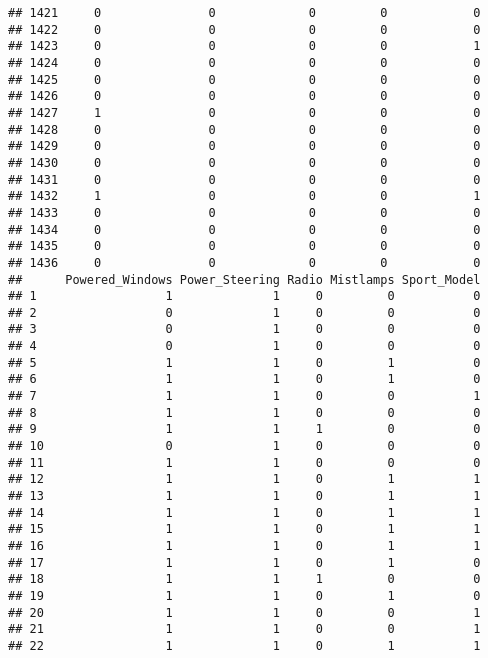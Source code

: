 \documentclass[]{article}
\begin{document}
\begin{verbatim}
## 1421     0               0             0         0            0
## 1422     0               0             0         0            0
## 1423     0               0             0         0            1
## 1424     0               0             0         0            0
## 1425     0               0             0         0            0
## 1426     0               0             0         0            0
## 1427     1               0             0         0            0
## 1428     0               0             0         0            0
## 1429     0               0             0         0            0
## 1430     0               0             0         0            0
## 1431     0               0             0         0            0
## 1432     1               0             0         0            1
## 1433     0               0             0         0            0
## 1434     0               0             0         0            0
## 1435     0               0             0         0            0
## 1436     0               0             0         0            0
##      Powered_Windows Power_Steering Radio Mistlamps Sport_Model
## 1                  1              1     0         0           0
## 2                  0              1     0         0           0
## 3                  0              1     0         0           0
## 4                  0              1     0         0           0
## 5                  1              1     0         1           0
## 6                  1              1     0         1           0
## 7                  1              1     0         0           1
## 8                  1              1     0         0           0
## 9                  1              1     1         0           0
## 10                 0              1     0         0           0
## 11                 1              1     0         0           0
## 12                 1              1     0         1           1
## 13                 1              1     0         1           1
## 14                 1              1     0         1           1
## 15                 1              1     0         1           1
## 16                 1              1     0         1           1
## 17                 1              1     0         1           0
## 18                 1              1     1         0           0
## 19                 1              1     0         1           0
## 20                 1              1     0         0           1
## 21                 1              1     0         0           1
## 22                 1              1     0         1           1

\end{verbatim}
\end{document}
